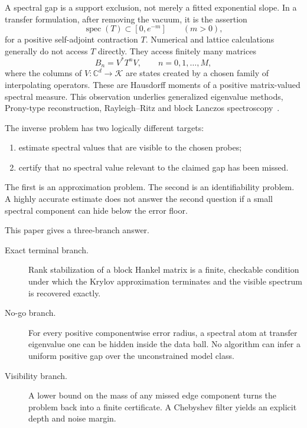 \documentclass[11pt]{article}
\theoremstyle{definition}
\theoremstyle{remark}
\newcommand{\C}{\mathbb C}
\newcommand{\K}{\mathcal K}
\newcommand{\spec}{\operatorname{spec}}
\begin{document}
A spectral gap is a support exclusion, not merely a fitted exponential slope.
In a transfer formulation, after removing the vacuum, it is the assertion
\begin{equation}
  \spec(T)\subset[0,e^{-m}]
  \qquad (m>0),                                      \label{eq:gap}
\end{equation}
for a positive self-adjoint contraction $T$.  Numerical and lattice
calculations generally do not access $T$ directly.  They access finitely many
matrices
\begin{equation}
  B_n=V^*T^nV,\qquad n=0,1,\ldots,M,                 \label{eq:moments}
\end{equation}
where the columns of $V:\C^d\to\K$ are states created by a chosen family of
interpolating operators.  These are Hausdorff moments of a positive
matrix-valued spectral measure.  This observation underlies generalized
eigenvalue methods, Prony-type reconstruction, Rayleigh--Ritz and block
Lanczos spectroscopy~\cite{Blossier2009,Fleming2023,Wagman2025,FilteredRR,MomentMatrix2025}.

The inverse problem has two logically different targets:
\begin{enumerate}[label=(\roman*)]
  \item estimate spectral values that are visible to the chosen probes;
  \item certify that no spectral value relevant to the claimed gap has been
  missed.
\end{enumerate}
The first is an approximation problem.  The second is an identifiability
problem.  A highly accurate estimate does not answer the second question if a
small spectral component can hide below the error floor.

This paper gives a three-branch answer.
\begin{description}
\item[Exact terminal branch.]
Rank stabilization of a block Hankel matrix is a finite, checkable condition
under which the Krylov approximation terminates and the visible spectrum is
recovered exactly.
\item[No-go branch.]
For every positive componentwise error radius, a spectral atom at transfer
eigenvalue one can be hidden inside the data ball.  No algorithm can infer a
uniform positive gap over the unconstrained model class.
\item[Visibility branch.]
A lower bound on the mass of any missed edge component turns the problem back
into a finite certificate.  A Chebyshev filter yields an explicit depth and
noise margin.
\end{description}
\end{document}
